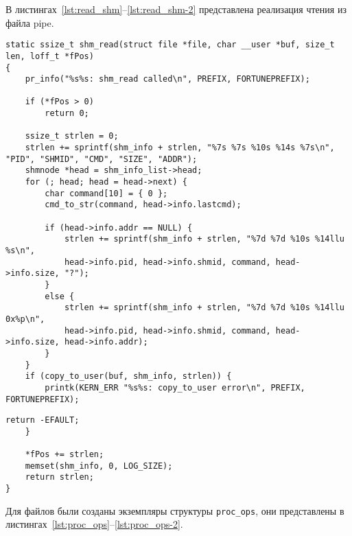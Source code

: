 В листингах~\ref{lst:read_shm}--\ref{lst:read_shm-2} представлена реализация чтения из файла pipe.

\begin{lstlisting}[label=lst:read_shm, caption=Реализация функции чтения из файла shm]			
static ssize_t shm_read(struct file *file, char __user *buf, size_t len, loff_t *fPos)
{
	pr_info("%s%s: shm_read called\n", PREFIX, FORTUNEPREFIX);
	
	if (*fPos > 0)
		return 0;
	
	ssize_t strlen = 0;
	strlen += sprintf(shm_info + strlen, "%7s %7s %10s %14s %7s\n", "PID", "SHMID", "CMD", "SIZE", "ADDR");
	shmnode *head = shm_info_list->head;
	for (; head; head = head->next)	{
		char command[10] = { 0 };    
		cmd_to_str(command, head->info.lastcmd);
		
		if (head->info.addr == NULL) {
			strlen += sprintf(shm_info + strlen, "%7d %7d %10s %14llu %s\n",
			head->info.pid, head->info.shmid, command, head->info.size, "?"); 
		}
		else { 
			strlen += sprintf(shm_info + strlen, "%7d %7d %10s %14llu 0x%p\n",
			head->info.pid, head->info.shmid, command, head->info.size, head->info.addr);
		}
	}
	if (copy_to_user(buf, shm_info, strlen)) {
		printk(KERN_ERR "%s%s: copy_to_user error\n", PREFIX, FORTUNEPREFIX);
\end{lstlisting}
\begin{lstlisting}[label=lst:read_shm-2, caption=Реализация функции чтения из файла shm]			
		return -EFAULT;
	}
	
	*fPos += strlen;
	memset(shm_info, 0, LOG_SIZE);
	return strlen;
}
\end{lstlisting}

Для файлов были созданы экземпляры структуры \texttt{proc\_ops}, они представлены в листингах~\ref{lst:proc_ops}--\ref{lst:proc_ops-2}.

